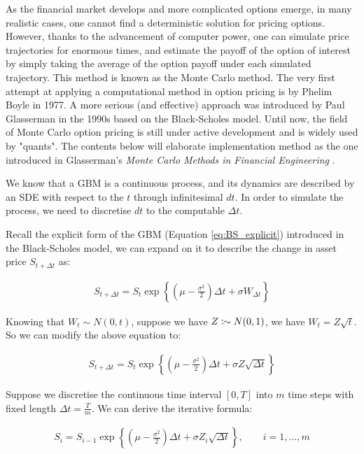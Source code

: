 As the financial market develops and more complicated options emerge, in many realistic cases, one cannot find a deterministic solution for pricing options. However, thanks to the advancement of computer power, one can simulate price trajectories for enormous times, and estimate the payoff of the option of interest by simply taking the average of the option payoff under each simulated trajectory. This method is known as the Monte Carlo method. The very first attempt at applying a computational method in option pricing is by Phelim Boyle in 1977. A more serious (and effective) approach was introduced by Paul Glasserman in the 1990s based on the Black-Scholes model. Until now, the field of Monte Carlo option pricing is still under active development and is widely used by "quants". The contents below will elaborate implementation method as the one introduced in Glasserman's \textit{Monte Carlo Methods in Financial Engineering} \cite{Glasserman2003}.

We know that a GBM is a continuous process, and its dynamics are described by an SDE with respect to the $t$ through infinitesimal $dt$. In order to simulate the process, we need to discretise $dt$ to the computable $\Delta t$.

Recall the explicit form of the GBM (Equation \ref{eq:BS_explicit}) introduced in the Black-Scholes model, we can expand on it to describe the change in asset price $S_{t+\Delta t}$ as:

\begin{align*}
S_{t+\Delta t} = S_t\exp{\left\{(\mu-\frac{\sigma^2}{2})\Delta t+\sigma W_{\Delta t}\right\}}
\end{align*}

Knowing that $W_t\sim N(0,t)$, suppose we have $Z\colonsim N(0,1)$, we have $W_t=Z\sqrt{t}$. So we can modify the above equation to:

\begin{align*}
S_{t+\Delta t} = S_t\exp{\left\{(\mu-\frac{\sigma^2}{2})\Delta t+\sigma Z \sqrt{\Delta t}\right\}}
\end{align*}

Suppose we discretise the continuous time interval $[0,T]$ into $m$ time steps with fixed length $\Delta t=\frac{T}{m}$. We can derive the iterative formula:

\begin{align} \label{eq:mc_explicit}
S_{i} = S_{i-1}\exp{\left\{(\mu-\frac{\sigma^2}{2})\Delta t+\sigma Z_i \sqrt{\Delta t}\right\}},\qquad i=1,...,m
\end{align}

